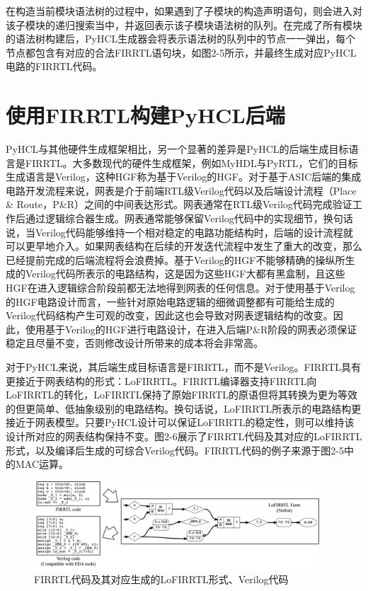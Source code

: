 在构造当前模块语法树的过程中，如果遇到了子模块的构造声明语句，则会进入对该子模块的递归搜索当中，并返回表示该子模块语法树的队列。在完成了所有模块的语法树构建后，PyHCL生成器会将表示语法树的队列中的节点一一弹出，每个节点都包含有对应的合法FIRRTL语句块，如图2-5所示，并最终生成对应PyHCL电路的FIRRTL代码。

\section{使用FIRRTL构建PyHCL后端}

PyHCL与其他硬件生成框架相比，另一个显著的差异是PyHCL的后端生成目标语言是FIRRTL。大多数现代的硬件生成框架，例如MyHDL与PyRTL，它们的目标生成语言是Verilog，这种HGF称为基于Verilog的HGF。对于基于ASIC后端的集成电路开发流程来说，网表是介于前端RTL级Verilog代码以及后端设计流程（Place \& Route，P\&R）之间的中间表达形式。网表通常在RTL级Verilog代码完成验证工作后通过逻辑综合器生成。网表通常能够保留Verilog代码中的实现细节，换句话说，当Verilog代码能够维持一个相对稳定的电路功能结构时，后端的设计流程就可以更早地介入。如果网表结构在后续的开发迭代流程中发生了重大的改变，那么已经提前完成的后端流程将会浪费掉。基于Verilog的HGF不能够精确的操纵所生成的Verilog代码所表示的电路结构，这是因为这些HGF大都有黑盒制，且这些HGF在进入逻辑综合阶段前都无法地得到网表的任何信息。对于使用基于Verilog的HGF电路设计而言，一些针对原始电路逻辑的细微调整都有可能给生成的Verilog代码结构产生可观的改变，因此这也会导致对网表逻辑结构的改变。因此，使用基于Verilog的HGF进行电路设计，在进入后端P\&R阶段的网表必须保证稳定且尽量不变，否则修改设计所带来的成本将会非常高。

对于PyHCL来说，其后端生成目标语言是FIRRTL，而不是Verilog。FIRRTL具有更接近于网表结构的形式：LoFIRRTL。FIRRTL编译器支持FIRRTL向LoFIRRTL的转化，LoFIRRTL保持了原始FIRRTL的原语但将其转换为更为等效的但更简单、低抽象级别的电路结构。换句话说，LoFIRRTL所表示的电路结构更接近于网表模型。只要PyHCL设计可以保证LoFIRRTL的稳定性，则可以维持该设计所对应的网表结构保持不变。图2-6展示了FIRRTL代码及其对应的LoFIRRTL形式，以及编译后生成的可综合Verilog代码。FIRRTL代码的例子来源于图2-5中的MAC运算。

\begin{figure}[htbp]
	\centering
	\includegraphics[width=0.95\textwidth]{Photos/FIRRTL_intro.jpg}
	\caption{FIRRTL代码及其对应生成的LoFIRRTL形式、Verilog代码}
\end{figure}


